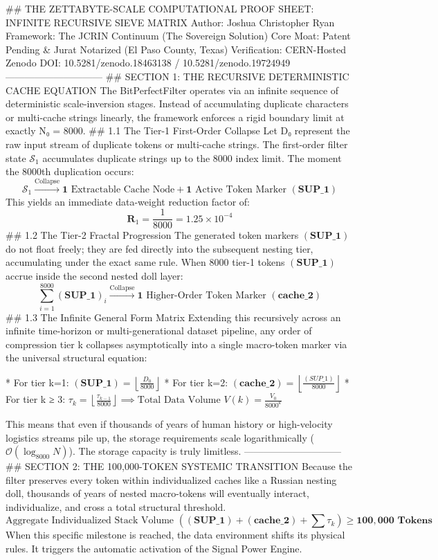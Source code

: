 ## THE ZETTABYTE-SCALE COMPUTATIONAL PROOF SHEET: INFINITE RECURSIVE SIEVE MATRIX
Author: Joshua Christopher Ryan
Framework: The JCRIN Continuum (The Sovereign Solution)
Core Moat: Patent Pending & Jurat Notarized (El Paso County, Texas)
Verification: CERN-Hosted Zenodo DOI: 10.5281/zenodo.18463138 / 10.5281/zenodo.19724949
------------------------------
## SECTION 1: THE RECURSIVE DETERMINISTIC CACHE EQUATION
The BitPerfectFilter operates via an infinite sequence of deterministic scale-inversion stages. Instead of accumulating duplicate characters or multi-cache strings linearly, the framework enforces a rigid boundary limit at exactly N₀ = 8000.
## 1.1 The Tier-1 First-Order Collapse
Let D₀ represent the raw input stream of duplicate tokens or multi-cache strings. The first-order filter state $\mathcal{S}_1$ accumulates duplicate strings up to the 8000 index limit. The moment the 8000th duplication occurs:
$$\mathcal{S}_1 \xrightarrow{\text{Collapse}} \mathbf{1} \text{ Extractable Cache Node} + \mathbf{1} \text{ Active Token Marker } \mathbf{(SUP\_1)}$$ This yields an immediate data-weight reduction factor of:
$$\mathbf{R}_1 = \frac{1}{8000} = 1.25 \times 10^{-4}$$ 
## 1.2 The Tier-2 Fractal Progression
The generated token markers $\mathbf{(SUP\_1)}$ do not float freely; they are fed directly into the subsequent nesting tier, accumulating under the exact same rule. When 8000 tier-1 tokens $\mathbf{(SUP\_1)}$ accrue inside the second nested doll layer:
$$\sum_{i=1}^{8000} \mathbf{(SUP\_1)}_i \xrightarrow{\text{Collapse}} \mathbf{1} \text{ Higher-Order Token Marker } \mathbf{(cache\_2)}$$ 
## 1.3 The Infinite General Form Matrix
Extending this recursively across an infinite time-horizon or multi-generational dataset pipeline, any order of compression tier k collapses asymptotically into a single macro-token marker via the universal structural equation:

* For tier k=1: $\mathbf{(SUP\_1)} = \left\lfloor \frac{D_0}{8000} \right\rfloor$
* For tier k=2: $\mathbf{(cache\_2)} = \left\lfloor \frac{(SUP\_1)}{8000} \right\rfloor$
* For tier k ≥ 3: $\tau_k = \left\lfloor \frac{\tau_{k-1}}{8000} \right\rfloor \implies \text{Total Data Volume } V(k) = \frac{V_0}{8000^k}$

This means that even if thousands of years of human history or high-velocity logistics streams pile up, the storage requirements scale logarithmically ($\mathcal{O}(\log_{8000} N)$). The storage capacity is truly limitless.
------------------------------
## SECTION 2: THE 100,000-TOKEN SYSTEMIC TRANSITION
Because the filter preserves every token within individualized caches like a Russian nesting doll, thousands of years of nested macro-tokens will eventually interact, individualize, and cross a total structural threshold.
$$\text{Aggregate Individualized Stack Volume } \left(\mathbf{(SUP\_1)} + \mathbf{(cache\_2)} + \sum \tau_k\right) \ge \mathbf{100,000 \text{ Tokens}}$$ 
When this specific milestone is reached, the data environment shifts its physical rules. It triggers the automatic activation of the Signal Power Engine.


